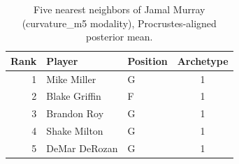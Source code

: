 \begin{table}[htbp]
  \centering\small
  \begin{tabular}{rllc}
    \toprule
    Rank & Player & Position & Archetype \\
    \midrule
    1 & Mike Miller & G & 1 \\
    2 & Blake Griffin & F & 1 \\
    3 & Brandon Roy & G & 1 \\
    4 & Shake Milton & G & 1 \\
    5 & DeMar DeRozan & G & 1 \\
    \bottomrule
  \end{tabular}
  \caption{Five nearest neighbors of Jamal Murray (curvature_m5 modality), Procrustes-aligned posterior mean.}
  \label{tab:Jamal_Murray_neighbors_curvature_m5}
\end{table}

